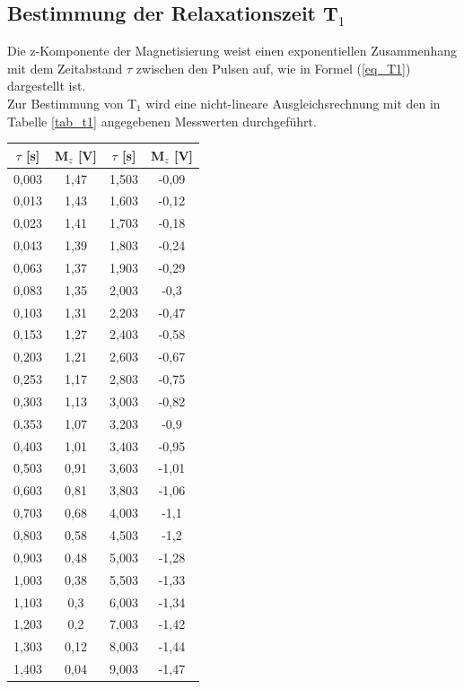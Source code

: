 \documentclass[]{scrartcl}
\begin{document}
\subsection{Bestimmung der Relaxationszeit T$_1$}
Die z-Komponente der Magnetisierung weist einen exponentiellen Zusammenhang mit dem Zeitabstand $\tau$ zwischen den Pulsen auf, wie in Formel (\ref{eq_T1}) dargestellt ist. \\
Zur Bestimmung von T$_1$ wird eine nicht-lineare Ausgleichsrechnung mit den in Tabelle \ref{tab_t1} angegebenen Messwerten durchgeführt. \\
\begin{center}
	\begin{tabular}{|c|c||c|c|}
		\hline	$\tau$ [s]	&	M$_z$ [V] & $\tau$ [s]	&	M$_z$ [V]\\
		\hline	0,003	&	1,47	&	1,503	&	-0,09	\\
		\hline	0,013	&	1,43	&	1,603	&	-0,12	\\
		\hline	0,023	&	1,41	&	1,703	&	-0,18	\\
		\hline	0,043	&	1,39	&	1,803	&	-0,24	\\
		\hline	0,063	&	1,37	&	1,903	&	-0,29	\\
		\hline	0,083	&	1,35	&	2,003	&	-0,3	\\
		\hline	0,103	&	1,31	&	2,203	&	-0,47	\\
		\hline	0,153	&	1,27	&	2,403	&	-0,58	\\
		\hline	0,203	&	1,21	&	2,603	&	-0,67	\\
		\hline	0,253	&	1,17	&	2,803	&	-0,75	\\
		\hline	0,303	&	1,13	&	3,003	&	-0,82	\\
		\hline	0,353	&	1,07	&	3,203	&	-0,9	\\
		\hline	0,403	&	1,01	&	3,403	&	-0,95	\\
		\hline	0,503	&	0,91	&	3,603	&	-1,01	\\
		\hline	0,603	&	0,81	&	3,803	&	-1,06	\\
		\hline	0,703	&	0,68	&	4,003	&	-1,1	\\
		\hline	0,803	&	0,58	&	4,503	&	-1,2	\\
		\hline	0,903	&	0,48	&	5,003	&	-1,28	\\
		\hline	1,003	&	0,38	&	5,503	&	-1,33	\\
		\hline	1,103	&	0,3	&	6,003	&	-1,34	\\
		\hline	1,203	&	0,2	&	7,003	&	-1,42	\\
		\hline	1,303	&	0,12	&	8,003	&	-1,44	\\
		\hline	1,403	&	0,04	&	9,003	&	-1,47	\\
		\hline
	\end{tabular}
	\label{tab_t1}
\end{center}
\end{document}
